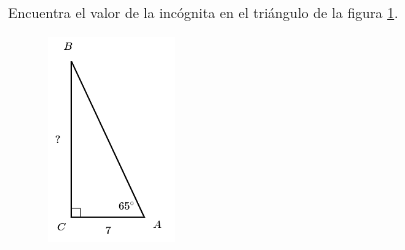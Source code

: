 \question[15]  Encuentra el valor de la incógnita en el triángulo de la figura \ref{fig:lados_functrig_24}.
\begin{figure}[H]
    \begin{center}
        \includegraphics[width=0.3\textwidth]{../images/lados_functrig_24.png}
    \end{center}
    \caption{}
    \label{fig:lados_functrig_24}
\end{figure}